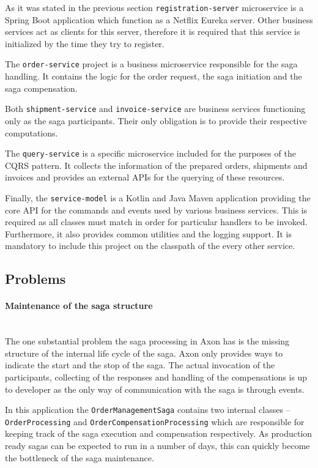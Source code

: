 \documentclass[oneside,
  digital, %
  table,   %
  nolof,     %
  nolot,     %
]{fithesis3}
\newcommand{\newlinepar}[1]{\paragraph{#1}\needspace{4\baselineskip}\mbox{}\\}
\begin{document}
As it was stated in the previous section \texttt{registration-server} microservice is a Spring Boot application which function as a Netflix Eureka server. Other business services act as clients for this server, therefore it is required that this service is initialized by the time they try to register.

The \texttt{order-service} project is a business microservice responsible for the saga handling. It contains the logic for the order request, the saga initiation and the saga compensation.

Both \texttt{shipment-service} and \texttt{invoice-service} are business services functioning only as the saga participants. Their only obligation is to provide their respective computations.

The \texttt{query-service} is a specific microservice included for the purposes of the CQRS pattern. It collects the information of the prepared orders, shipments and invoices and provides an external APIs for the querying of these resources. 

Finally, the \texttt{service-model} is a Kotlin and Java Maven application providing the core API for the commands and events used by various business services. This is required as all classes must match in order for particular handlers to be invoked. Furthermore, it also provides common utilities and the logging support. It is mandatory to include this project on the classpath of the every other service.

\subsection{Problems}
\label{sec:axon-problems}

\newlinepar{Maintenance of the saga structure}

The one substantial problem the saga processing in Axon has is the missing structure of the internal life cycle of the saga. Axon only provides ways to indicate the start and the stop of the saga. The actual invocation of the participants, collecting of the responses and handling of the compensations is up to developer as the only way of communication with the saga is through events.

In this application the \texttt{OrderManagementSaga} contains two internal classes -- \texttt{OrderProcessing} and \texttt{OrderCompensationProcessing} which are responsible for keeping track of the saga execution and compensation respectively. As production ready sagas can be expected to run in a number of days, this can quickly become the bottleneck of the saga maintenance.
\end{document}
